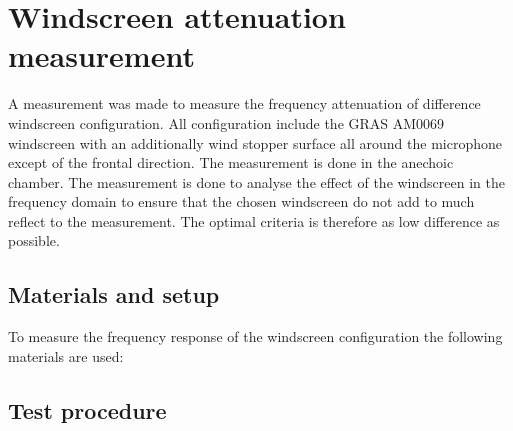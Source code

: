 \chapter{Windscreen attenuation measurement}
A measurement was made to measure the frequency attenuation of difference windscreen configuration. All configuration include the GRAS AM0069 windscreen with an additionally wind stopper surface all around the microphone except of the frontal direction. The measurement is done in the anechoic chamber. The measurement is done to analyse the effect of the windscreen in the frequency domain to ensure that the chosen windscreen do not add to much reflect to the measurement. The optimal criteria is therefore as low difference as possible. 




\section*{Materials and setup}
To measure the frequency response of the windscreen configuration the following materials are used:

\startequipment
{}
\stopequipment
\startequipment
{}
\stopequipment




\section*{Test procedure}


